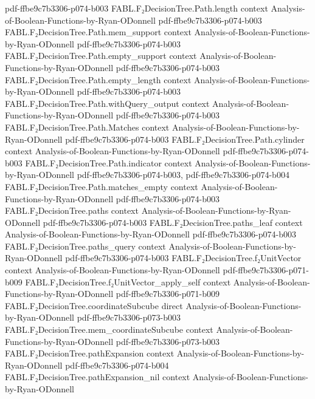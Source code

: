 \begin{theorem}
  {pdf-ffbe9c7b3306-p074-b003}
\proofstep
  {FABL.F₂DecisionTree.Path.length}
  {context}
  {Analysis-of-Boolean-Functions-by-Ryan-ODonnell}
  {pdf-ffbe9c7b3306-p074-b003}
\proofstep
  {FABL.F₂DecisionTree.Path.mem_support}
  {context}
  {Analysis-of-Boolean-Functions-by-Ryan-ODonnell}
  {pdf-ffbe9c7b3306-p074-b003}
\proofstep
  {FABL.F₂DecisionTree.Path.empty_support}
  {context}
  {Analysis-of-Boolean-Functions-by-Ryan-ODonnell}
  {pdf-ffbe9c7b3306-p074-b003}
\proofstep
  {FABL.F₂DecisionTree.Path.empty_length}
  {context}
  {Analysis-of-Boolean-Functions-by-Ryan-ODonnell}
  {pdf-ffbe9c7b3306-p074-b003}
\proofstep
  {FABL.F₂DecisionTree.Path.withQuery_output}
  {context}
  {Analysis-of-Boolean-Functions-by-Ryan-ODonnell}
  {pdf-ffbe9c7b3306-p074-b003}
\proofstep
  {FABL.F₂DecisionTree.Path.Matches}
  {context}
  {Analysis-of-Boolean-Functions-by-Ryan-ODonnell}
  {pdf-ffbe9c7b3306-p074-b003}
\proofstep
  {FABL.F₂DecisionTree.Path.cylinder}
  {context}
  {Analysis-of-Boolean-Functions-by-Ryan-ODonnell}
  {pdf-ffbe9c7b3306-p074-b003}
\proofstep
  {FABL.F₂DecisionTree.Path.indicator}
  {context}
  {Analysis-of-Boolean-Functions-by-Ryan-ODonnell}
  {pdf-ffbe9c7b3306-p074-b003,
    pdf-ffbe9c7b3306-p074-b004}
\proofstep
  {FABL.F₂DecisionTree.Path.matches_empty}
  {context}
  {Analysis-of-Boolean-Functions-by-Ryan-ODonnell}
  {pdf-ffbe9c7b3306-p074-b003}
\proofstep
  {FABL.F₂DecisionTree.paths}
  {context}
  {Analysis-of-Boolean-Functions-by-Ryan-ODonnell}
  {pdf-ffbe9c7b3306-p074-b003}
\proofstep
  {FABL.F₂DecisionTree.paths_leaf}
  {context}
  {Analysis-of-Boolean-Functions-by-Ryan-ODonnell}
  {pdf-ffbe9c7b3306-p074-b003}
\proofstep
  {FABL.F₂DecisionTree.paths_query}
  {context}
  {Analysis-of-Boolean-Functions-by-Ryan-ODonnell}
  {pdf-ffbe9c7b3306-p074-b003}
\proofstep
  {FABL.F₂DecisionTree.f₂UnitVector}
  {context}
  {Analysis-of-Boolean-Functions-by-Ryan-ODonnell}
  {pdf-ffbe9c7b3306-p071-b009}
\proofstep
  {FABL.F₂DecisionTree.f₂UnitVector_apply_self}
  {context}
  {Analysis-of-Boolean-Functions-by-Ryan-ODonnell}
  {pdf-ffbe9c7b3306-p071-b009}
\proofstep
  {FABL.F₂DecisionTree.coordinateSubcube}
  {direct}
  {Analysis-of-Boolean-Functions-by-Ryan-ODonnell}
  {pdf-ffbe9c7b3306-p073-b003}
\proofstep
  {FABL.F₂DecisionTree.mem_coordinateSubcube}
  {context}
  {Analysis-of-Boolean-Functions-by-Ryan-ODonnell}
  {pdf-ffbe9c7b3306-p073-b003}
\proofstep
  {FABL.F₂DecisionTree.pathExpansion}
  {context}
  {Analysis-of-Boolean-Functions-by-Ryan-ODonnell}
  {pdf-ffbe9c7b3306-p074-b004}
\proofstep
  {FABL.F₂DecisionTree.pathExpansion_nil}
  {context}
  {Analysis-of-Boolean-Functions-by-Ryan-ODonnell}

\end{theorem}
